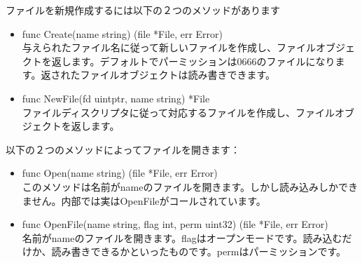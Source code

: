 ファイルを新規作成するには以下の２つのメソッドがあります

\begin{itemize}
  \item func Create(name string) (file *File, err Error)\\ 与えられたファイル名に従って新しいファイルを作成し、ファイルオブジェクトを返します。デフォルトでパーミッションは0666のファイルになります。返されたファイルオブジェクトは読み書きできます。
  \item func NewFile(fd uintptr, name string) *File\\ ファイルディスクリプタに従って対応するファイルを作成し、ファイルオブジェクトを返します。
\end{itemize}

以下の２つのメソッドによってファイルを開きます：

\begin{itemize}
  \item func Open(name string) (file *File, err Error)\\ このメソッドは名前がnameのファイルを開きます。しかし読み込みしかできません。内部では実はOpenFileがコールされています。
  \item func OpenFile(name string, flag int, perm uint32) (file *File, err Error) \\ 名前がnameのファイルを開きます。flagはオープンモードです。読み込むだけか、読み書きできるかといったものです。permはパーミッションです。
\end{itemize}
